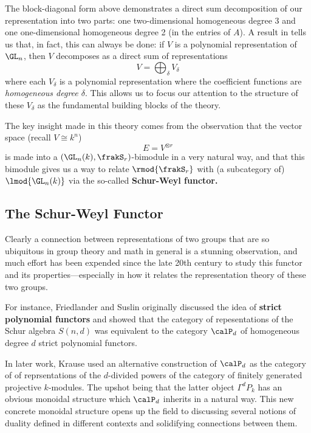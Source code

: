 \documentclass[12pt]{article}
\begin{document}
The block-diagonal form above demonstrates a direct sum decomposition of our representation into two parts: one two-dimensional homogeneous degree 3
and one one-dimensional homogeneous degree 2 (in the entries of $A$). A result in \cite{schur-thesis} tells us that, in fact, this can always be done: 
if $V$ is a polynomial representation of $\GL_n$,
then $V$ decomposes as a direct sum of representations 
\[V=\bigoplus_\delta V_\delta\]
where each $V_\delta$ is a polynomial representation where the coefficient functions are \textit{homogeneous degree $\delta$}. 
This allows us to focus our attention to the structure of these $V_\delta$ as the fundamental building blocks of the theory.

The key insight made in this theory comes from the observation that the vector space (recall $V\cong k^n$)
\[E=V^{\otimes r}\]
is made into a $(\GL_n(k),\frakS_r)$-bimodule in a very natural way, and that this bimodule gives us a way to relate 
$\rmod {\frakS_r}$ with (a subcategory of) $\lmod {\GL_n(k)}$ via the so-called \textbf{Schur-Weyl functor.}

\subsection{The Schur-Weyl Functor}
Clearly a connection between representations of two groups that are so ubiquitous in group theory and math in general 
is a stunning observation, and much effort has been expended since the late 20th century to study this functor and its 
properties---especially in how it relates the representation theory of these two groups. 

For instance, Friedlander and Suslin \cite{friedlander-suslin}
originally discussed the idea of \textbf{strict polynomial functors} and showed that the category of repesentations 
of the Schur algebra $S(n,d)$ was equivalent to the category $\calP_d$ of homogeneous degree $d$ strict polynomial functors.

In later work, Krause \cite{krause-strict-poly-func} used an alternative construction of $\calP_d$ as the category of
of reprsentations of the $d$-divided powers of the category of finitely generated projective $k$-modules. The upshot being that 
the latter object $\Gamma^d P_k$ has an obvious monoidal structure which $\calP_d$ inherits in a natural way. This new concrete 
monoidal structure opens up the field to discussing several notions of duality defined in different contexts 
and solidifying connections between them.
\end{document}
